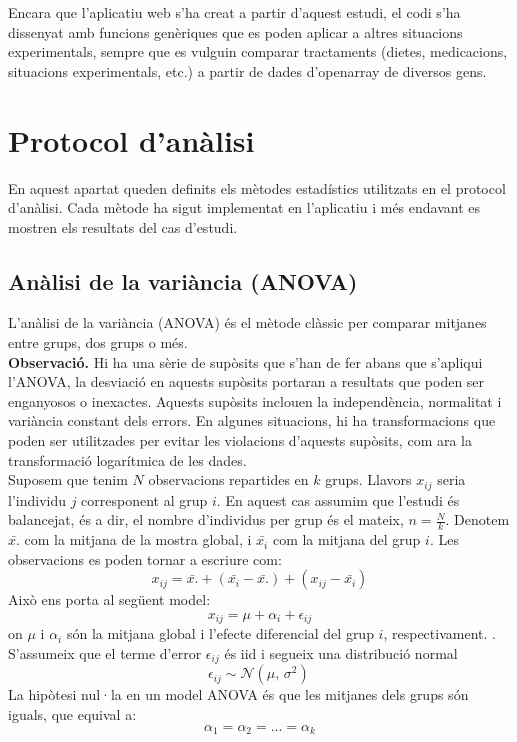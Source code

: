 \documentclass[english]{article}
\begin{document}
Encara que l'aplicatiu web s'ha creat a partir d'aquest estudi, el codi s'ha dissenyat amb funcions genèriques que es poden aplicar a altres situacions experimentals, sempre que es vulguin comparar tractaments (dietes, medicacions, situacions experimentals, etc.) a partir de dades d'openarray de diversos gens.

\section{Protocol d'anàlisi}
En aquest apartat queden definits els mètodes estadístics utilitzats en el protocol d'anàlisi. Cada mètode ha sigut implementat en l'aplicatiu i més endavant es mostren els resultats del cas d'estudi.
\subsection{Anàlisi de la variància (ANOVA)}
L'anàlisi de la variància (ANOVA) és el mètode clàssic per comparar mitjanes entre grups, dos grups o més.
\\

\noindent\textbf{Observació.} Hi ha una sèrie de supòsits que s'han de fer abans que s'apliqui l'ANOVA, la desviació en aquests supòsits portaran a resultats que poden ser enganyosos o inexactes. Aquests supòsits inclouen la independència, normalitat i variància constant dels errors. En algunes situacions, hi ha transformacions que poden ser utilitzades per evitar les violacions d'aquests supòsits, com ara la transformació logarítmica de les dades.
\\

Suposem que tenim $N$ observacions repartides en $k$ grups. Llavors $x_{ij}$ seria l'individu $j$ corresponent al grup $i$. En aquest cas assumim que l'estudi és balancejat, és a dir, el nombre d'individus per grup és el mateix, $n=\frac{N}{k}$. Denotem $\bar{x.}$ com la mitjana de la mostra global, i $\bar{x_{i}}$ com la mitjana del grup $i$.
Les observacions es poden tornar a escriure com:
\begin{equation*}
x_{ij} = \bar{x.} + (\bar{x_{i}} - \bar{x.}) + (x_{ij} - \bar{x_{i}})
\end{equation*}
Això ens porta al següent model:
\begin{equation*}
x_{ij} = \mu + \alpha_{i} + \epsilon_{ij}
\end{equation*}
on $\mu$ i $\alpha_{i}$ són la mitjana global i l'efecte diferencial del grup $i$, respectivament. . S'assumeix que el terme d'error $\epsilon_{ij}$ és iid i segueix una distribució normal
\begin{equation*}
\epsilon_{ij} \sim \mathcal{N}(\mu,\,\sigma^{2})\,
\end{equation*}
La hipòtesi nul·la en un model ANOVA és que les mitjanes dels grups són iguals, que equival a:
\begin{equation*}
\alpha_1 = \alpha_2 = ... = \alpha_k
\end{equation*}
\end{document}
